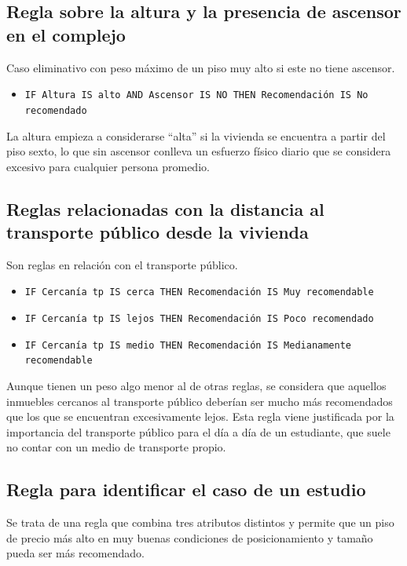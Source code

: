 \documentclass[12pt]{report} %
\begin{document}
    \subsection{Regla sobre la altura y la presencia de ascensor en el complejo}
    Caso eliminativo con peso máximo de un piso muy alto si este no tiene ascensor. 

    \begin{itemize}
        \item \texttt{IF Altura IS alto AND Ascensor IS NO THEN Recomendación IS No recomendado}
    \end{itemize}

    La altura empieza a considerarse ``alta'' si la vivienda se encuentra a partir del piso sexto, 
    lo que sin ascensor conlleva un esfuerzo físico diario que se considera excesivo para cualquier 
    persona promedio.

    \subsection{Reglas relacionadas con la distancia al transporte público desde la vivienda}
    Son reglas en relación con el transporte público.

    \begin{itemize}
        \item \texttt{IF Cercanía tp IS cerca THEN Recomendación IS Muy recomendable}
        \item \texttt{IF Cercanía tp IS lejos THEN Recomendación IS Poco recomendado}
        \item \texttt{IF Cercanía tp IS medio THEN Recomendación IS Medianamente recomendable}
    \end{itemize}
    
    Aunque tienen un peso algo menor al de otras
    reglas, se considera que aquellos inmuebles cercanos al transporte público deberían ser mucho 
    más recomendados que los que se encuentran excesivamente lejos. Esta regla viene justificada
    por la importancia del transporte público para el día a día de un estudiante, que suele no contar 
    con un medio de transporte propio.

    \subsection{Regla para identificar el caso de un estudio}
    Se trata de una regla que combina tres atributos distintos y permite que un piso de precio más 
    alto en muy buenas condiciones de posicionamiento y tamaño pueda ser más recomendado.
\end{document}
